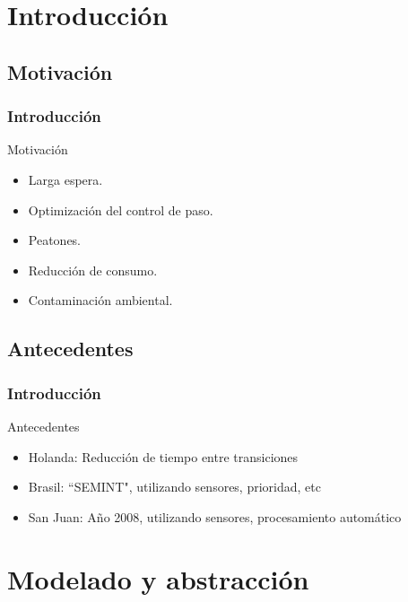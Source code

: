 \section{Introducción} 

\subsection{Motivación}

\begin{frame}
	\frametitle{Introducción}
		\begin{block}{Motivación}
			\begin{itemize}
				\item Larga espera.
				\item Optimización del control de paso.
				\item Peatones.
				\item Reducción de consumo.
				\item Contaminación ambiental.
			\end{itemize}
		\end{block}
\end{frame}

\subsection{Antecedentes}

\begin{frame}
\frametitle{Introducción}
\begin{block}{Antecedentes}
	\begin{itemize}
		\item Holanda: Reducción de tiempo entre transiciones %
		\item Brasil: ``SEMINT", utilizando sensores, prioridad, etc %
		\item San Juan: Año 2008, utilizando sensores, procesamiento automático
	\end{itemize}
\end{block}
\end{frame}

\section{Modelado y abstracción}

